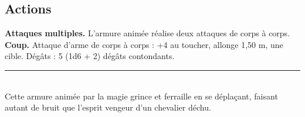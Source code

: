 \begin{figure*}[hb!]
{\begin{minipage}[c]{.45\linewidth}
\vspace{-10pt}
    \subsection*{Actions}
    {\bfseries Attaques multiples.} L'armure animée réalise deux attaques de corps à corps.\\
    {\bfseries Coup.} Attaque d'arme de corps à corps : +4 au toucher, allonge 1,50 m, une cible. Dégâts : 5 (1d6 + 2) dégâts contondants.\\
    \noindent\rule{\textwidth}{1pt} \\
    Cette armure animée par la magie grince et ferraille en se déplaçant, faisant autant de bruit que l'esprit vengeur d'un chevalier déchu.
  \end{minipage}
}%
\end{figure*}

